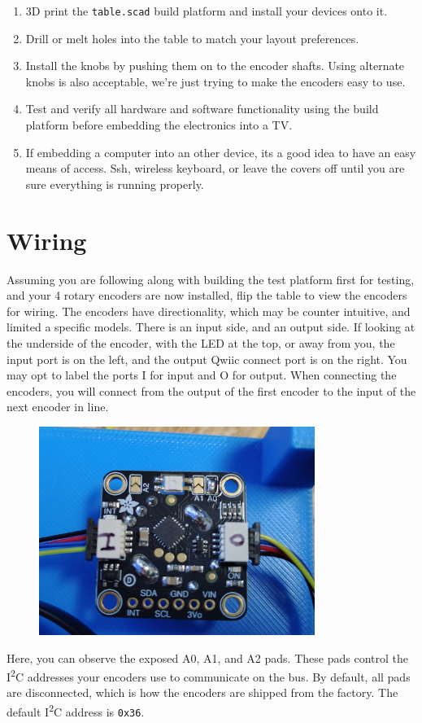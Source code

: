 \documentclass[]{article}
\begin{document}
\begin{enumerate}
	\item 3D print the \texttt{table.scad} build platform and install your devices onto it.
	\item Drill or melt holes into the table  to match your layout preferences. 
	\item Install the knobs by pushing them on to the encoder shafts. Using alternate knobs is also acceptable, we're just trying to make the encoders easy to use.
	\item Test and verify all hardware and software functionality using the build platform before embedding the electronics into a TV.
	\item If embedding a computer into an other device, its a good idea to have an easy means of access. Ssh, wireless keyboard, or leave the covers off until you are sure everything is running properly. 
\end{enumerate}

\section*{Wiring}
Assuming you are following along with building the test platform first for testing, and your 4 rotary encoders are now installed, flip the table to view the encoders for wiring.
The encoders have directionality, which may be counter intuitive, and limited a specific models. There is an input side, and an output side. If looking at the underside of the encoder, with the LED at the top, or away from you, the input port is on the left, and the output Qwiic connect port is on the right. You may opt to label the ports I for input and O for output. When connecting the encoders, you will connect from the output of the first encoder to the input of the next encoder in line. 
\begin{figure}[ht]
	\centering
	\includegraphics[width=0.8\textwidth]{underside.png}
	\label{fig:encoder_underside}
\end{figure}
Here, you can observe the exposed A0, A1, and A2 pads. These pads control the I\textsuperscript{2}C addresses your encoders use to communicate on the bus. 
By default, all pads are disconnected, which is how the encoders are shipped from the factory. The default I\textsuperscript{2}C address is \texttt{0x36}.
\end{document}
